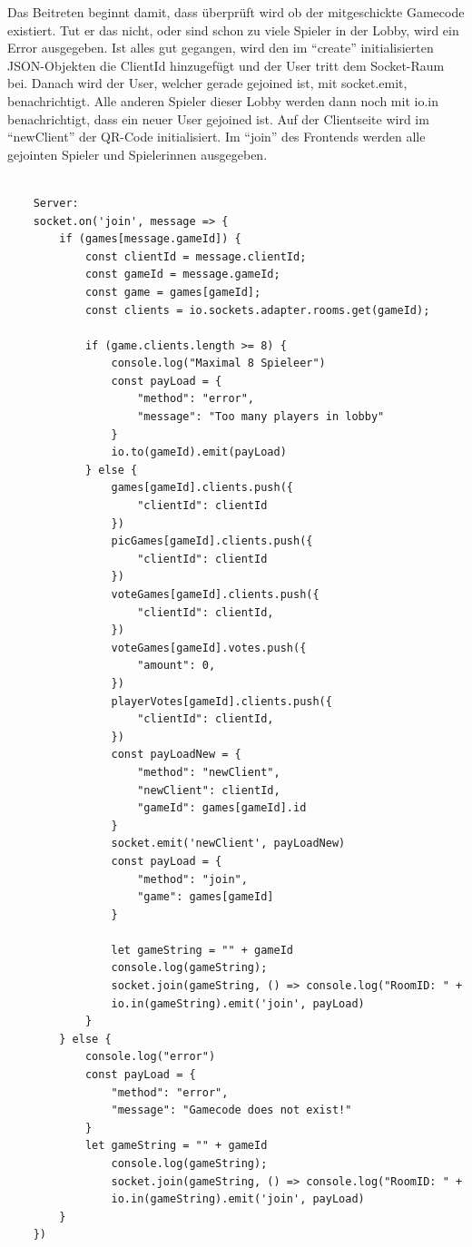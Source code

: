 Das Beitreten beginnt damit, dass überprüft wird ob der mitgeschickte Gamecode existiert.
Tut er das nicht, oder sind schon zu viele Spieler in der Lobby, wird ein Error ausgegeben. Ist alles gut gegangen, wird den im ``create'' initialisierten JSON-Objekten die ClientId hinzugefügt und der User tritt dem Socket-Raum bei. Danach wird der User, welcher gerade gejoined ist, mit socket.emit,
benachrichtigt. Alle anderen Spieler dieser Lobby werden dann noch mit io.in benachrichtigt,
dass ein neuer User gejoined ist. Auf der Clientseite wird im ``newClient'' der QR-Code initialisiert.
Im ``join'' des Frontends werden alle gejointen Spieler und Spielerinnen ausgegeben.
\begin{lstlisting}[language=html,caption=Join Game]
    
    Server:
    socket.on('join', message => {
        if (games[message.gameId]) {
            const clientId = message.clientId;
            const gameId = message.gameId;
            const game = games[gameId];
            const clients = io.sockets.adapter.rooms.get(gameId);

            if (game.clients.length >= 8) {
                console.log("Maximal 8 Spieleer")
                const payLoad = {
                    "method": "error",
                    "message": "Too many players in lobby"
                }
                io.to(gameId).emit(payLoad)
            } else {
                games[gameId].clients.push({
                    "clientId": clientId
                })
                picGames[gameId].clients.push({
                    "clientId": clientId
                })
                voteGames[gameId].clients.push({
                    "clientId": clientId,
                })
                voteGames[gameId].votes.push({
                    "amount": 0,
                })
                playerVotes[gameId].clients.push({
                    "clientId": clientId,
                })
                const payLoadNew = {
                    "method": "newClient",
                    "newClient": clientId,
                    "gameId": games[gameId].id
                }
                socket.emit('newClient', payLoadNew)
                const payLoad = {
                    "method": "join",
                    "game": games[gameId]
                }

                let gameString = "" + gameId
                console.log(gameString);
                socket.join(gameString, () => console.log("RoomID: " + socket.rooms))
                io.in(gameString).emit('join', payLoad)
            }
        } else {
            console.log("error")
            const payLoad = {
                "method": "error",
                "message": "Gamecode does not exist!"
            }
            let gameString = "" + gameId
                console.log(gameString);
                socket.join(gameString, () => console.log("RoomID: " + socket.rooms))
                io.in(gameString).emit('join', payLoad)
        }
    })



\end{lstlisting}
